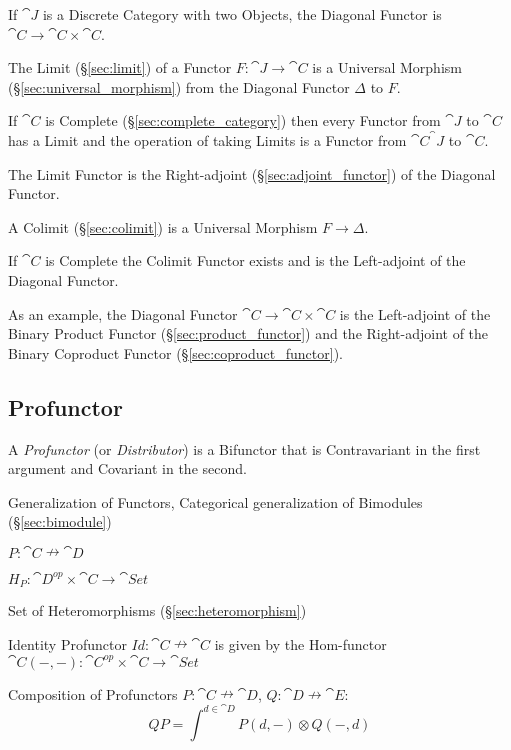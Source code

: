 If $\cat{J}$ is a Discrete Category with two Objects, the Diagonal
Functor is $\cat{C} \rightarrow \cat{C} \times \cat{C}$.

The Limit (\S\ref{sec:limit}) of a Functor $F : \cat{J} \rightarrow
\cat{C}$ is a Universal Morphism (\S\ref{sec:universal_morphism})
from the Diagonal Functor $\Delta$ to $F$.

If $\cat{C}$ is Complete (\S\ref{sec:complete_category}) then every
Functor from $\cat{J}$ to $\cat{C}$ has a Limit and the
operation of taking Limits is a Functor from $\cat{C}^\cat{J}$
to $\cat{C}$.

The Limit Functor is the Right-adjoint (\S\ref{sec:adjoint_functor})
of the Diagonal Functor.

A Colimit (\S\ref{sec:colimit}) is a Universal Morphism $F \rightarrow
\Delta$.

If $\cat{C}$ is Complete the Colimit Functor exists and is the
Left-adjoint of the Diagonal Functor.

As an example, the Diagonal Functor $\cat{C} \rightarrow \cat{C}
\times \cat{C}$ is the Left-adjoint of the Binary Product Functor
(\S\ref{sec:product_functor}) and the Right-adjoint of the Binary
Coproduct Functor (\S\ref{sec:coproduct_functor}).



\subsection{Profunctor}\label{sec:profunctor}

A \emph{Profunctor} (or \emph{Distributor}) is a Bifunctor that is
Contravariant in the first argument and Covariant in the second.

Generalization of Functors, Categorical generalization of Bimodules
(\S\ref{sec:bimodule})

$P : \cat{C} \nrightarrow \cat{D}$

$H_P : \cat{D}^{op} \times \cat{C} \rightarrow \cat{Set}$

Set of Heteromorphisms (\S\ref{sec:heteromorphism})

Identity Profunctor $Id : \cat{C} \nrightarrow \cat{C}$ is given by
the Hom-functor $\cat{C}(-,-) : \cat{C}^{op} \times \cat{C}
\rightarrow \cat{Set}$

Composition of Profunctors $P : \cat{C} \nrightarrow \cat{D}$, $Q :
\cat{D} \nrightarrow \cat{E}$:
\[
  Q P = \int^{d \in \cat{D}} P(d,-) \otimes Q(-,d)
\]

